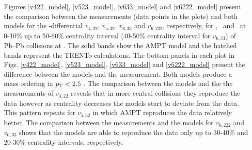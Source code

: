 

Figures \ref{v422_model}, \ref{v523_model}, \ref{v633_model} and \ref{v6222_model} present the comparison between the measurements (data points in the plots) and both models for the \pT-differential $v_{4,22}$, $v_{5,32}$, $v_{6,33}$ and $v_{6,222}$, respectively, for \pion, \kaon~and \proton~at 0-10\% up to 50-60\% centrality interval (40-50\% centrality interval for $v_{6,33}$) of Pb--Pb collisions at \sNN. The solid bands show the AMPT model and the hatched bands represent the TRENTo calculations. The bottom panels in each plot in Figs. \ref{v422_model}, \ref{v523_model}, \ref{v633_model} and \ref{v6222_model} present the difference between the models and the measurement. Both models produce a mass ordering in $p_{\rm{T}}<2.5$ \GeV. The comparison between the models and the the measurements of $v_{4,22}$ reveals that in more central collisions they reproduce the data however as centrality decreases the models start to deviate from the data. This pattern repeats for $v_{5,32}$ in which AMPT reproduces the data relatively better. The comparison between the measurements and the models  for $v_{6,222}$ and $v_{6,33}$ shows that the models are able to reproduce the data only up to 30-40\% and 20-30\% centrality intervals, respectively. 


